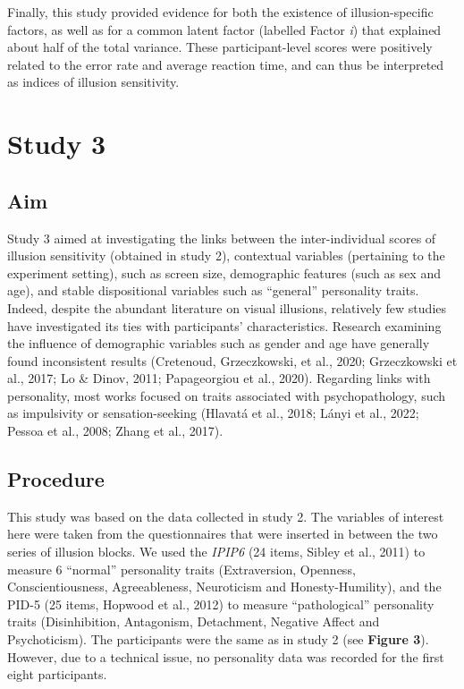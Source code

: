 \documentclass[
  man,floatsintext]{apa6}
\begin{document}
Finally, this study provided evidence for both the existence of illusion-specific factors, as well as for a common latent factor (labelled Factor \emph{i}) that explained about half of the total variance. These participant-level scores were positively related to the error rate and average reaction time, and can thus be interpreted as indices of illusion sensitivity.

\hypertarget{study-3}{%
\section{Study 3}\label{study-3}}

\hypertarget{aim-2}{%
\subsection{Aim}\label{aim-2}}

Study 3 aimed at investigating the links between the inter-individual scores of illusion sensitivity (obtained in study 2), contextual variables (pertaining to the experiment setting), such as screen size, demographic features (such as sex and age), and stable dispositional variables such as ``general'' personality traits. Indeed, despite the abundant literature on visual illusions, relatively few studies have investigated its ties with participants' characteristics. Research examining the influence of demographic variables such as gender and age have generally found inconsistent results (Cretenoud, Grzeczkowski, et al., 2020; Grzeczkowski et al., 2017; Lo \& Dinov, 2011; Papageorgiou et al., 2020). Regarding links with personality, most works focused on traits associated with psychopathology, such as impulsivity or sensation-seeking (Hlavatá et al., 2018; Lányi et al., 2022; Pessoa et al., 2008; Zhang et al., 2017).

\hypertarget{procedure-2}{%
\subsection{Procedure}\label{procedure-2}}

This study was based on the data collected in study 2. The variables of interest here were taken from the questionnaires that were inserted in between the two series of illusion blocks. We used the \emph{IPIP6} (24 items, Sibley et al., 2011) to measure 6 ``normal'' personality traits (Extraversion, Openness, Conscientiousness, Agreeableness, Neuroticism and Honesty-Humility), and the PID-5 (25 items, Hopwood et al., 2012) to measure ``pathological'' personality traits (Disinhibition, Antagonism, Detachment, Negative Affect and Psychoticism). The participants were the same as in study 2 (see \textbf{Figure 3}). However, due to a technical issue, no personality data was recorded for the first eight participants.
\end{document}
